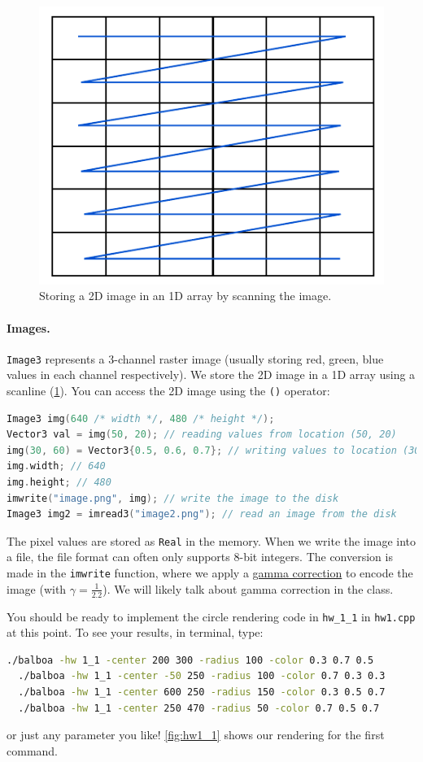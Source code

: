 \begin{figure}[h]
    \centering
    \includegraphics[width=0.4\linewidth]{imgs/scanline.pdf}
    \caption{Storing a 2D image in an 1D array by scanning the image.}
    \label{fig:scanline}
\end{figure}

\paragraph{Images.} \lstinline{Image3} represents a 3-channel raster image (usually storing red, green, blue values in each channel respectively). We store the 2D image in a 1D array using a scanline (\cref{fig:scanline}). You can access the 2D image using the \lstinline{()} operator:
\begin{lstlisting}[language=C++]
Image3 img(640 /* width */, 480 /* height */);
Vector3 val = img(50, 20); // reading values from location (50, 20)
img(30, 60) = Vector3{0.5, 0.6, 0.7}; // writing values to location (30, 60)
img.width; // 640
img.height; // 480
imwrite("image.png", img); // write the image to the disk
Image3 img2 = imread3("image2.png"); // read an image from the disk
\end{lstlisting}
The pixel values are stored as \lstinline{Real} in the memory. When we write the image into a file, the file format can often only supports 8-bit integers. The conversion is made in the \lstinline{imwrite} function, where we apply a \href{https://en.wikipedia.org/wiki/Gamma_correction}{gamma correction} to encode the image (with $\gamma=\frac{1}{2.2}$). We will likely talk about gamma correction in the class.

You should be ready to implement the circle rendering code in \lstinline{hw_1_1} in \lstinline{hw1.cpp} at this point. 
To see your results, in terminal, type:
\begin{lstlisting}[language=bash]
  ./balboa -hw 1_1 -center 200 300 -radius 100 -color 0.3 0.7 0.5
  ./balboa -hw 1_1 -center -50 250 -radius 100 -color 0.7 0.3 0.3
  ./balboa -hw 1_1 -center 600 250 -radius 150 -color 0.3 0.5 0.7
  ./balboa -hw 1_1 -center 250 470 -radius 50 -color 0.7 0.5 0.7
\end{lstlisting}
or just any parameter you like! \cref{fig:hw1_1} shows our rendering for the first command.

